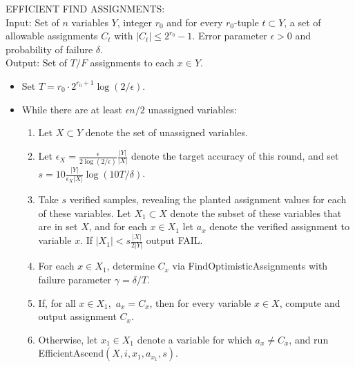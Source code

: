 \documentclass[final,12pt]{colt2018}
\newcommand{\eps}{\epsilon}
\begin{document}
\begin{algorithm}[H]
EFFICIENT FIND ASSIGNMENTS:\\
Input: Set of $n$ variables $Y$, integer $r_0$ and for every $r_0$-tuple $t \subset Y$, a set of allowable assignments $C_t$ with $|C_t| \le 2^{r_0}-1$.  Error parameter $\eps>0$ and probability of failure $\delta$. \\
Output: Set of $T/F$ assignments to each $x \in Y$.
\begin{itemize}
\item Set $T=  r_0\cdot 2^{r_0+1} \log (2/\eps)$.
\item While there are at least $\eps n/2$ unassigned variables:
\begin{enumerate}
\item Let $X \subset Y$ denote the set of unassigned variables.  
\item Let $\eps_X = \frac{\eps}{2\log(2/\eps)} \frac{|Y|}{|X|}$ denote the target accuracy of this round, and set $s = 10 \frac{|Y|}{\eps_X |X|} \log (10 T/\delta)$.
\item Take $s$ verified samples, revealing the planted assignment values for each of these variables.  Let $X_1\subset X$ denote the subset of these variables that are in set $X$, and for each $x \in X_1$ let $a_x$ denote the verified assignment to variable $x$.  If $|X_1| < s \frac{|X|}{2|Y|}$ output FAIL.
\item For each $x \in X_1$, determine $C_x$ via FindOptimisticAssignments with failure parameter $\gamma = \delta/T$.  
\item If, for all $x\in X_1,$ $a_x = C_x$, then for every variable $x \in X$, compute and output assignment $C_x$.
\item Otherwise, let $x_1 \in X_1$ denote a variable for which $a_x \neq C_x$, and run EfficientAscend$(X, i, x_1, a_{x_1}, s).$
\end{enumerate}
\end{itemize}
\end{algorithm}
\end{document}
